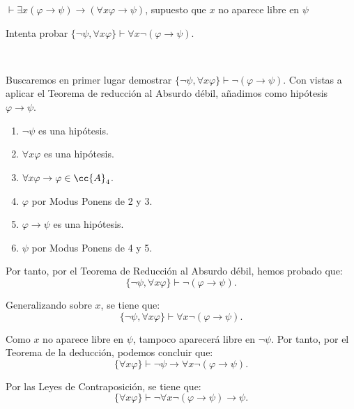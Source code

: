\begin{ejercicio}\label{ej:2.9}
    $\vdash \exists x(\varphi \rightarrow \psi) \rightarrow (\forall x \varphi \rightarrow \psi)$, supuesto que $x$ no aparece libre en $\psi$
    \begin{observacion}
        Intenta probar $\{\neg \psi, \forall x \varphi\} \vdash \forall x \neg (\varphi \rightarrow \psi)$.
    \end{observacion}~

    Buscaremos en primer lugar demostrar $\{\neg \psi, \forall x \varphi\} \vdash \neg (\varphi \rightarrow \psi)$. Con vistas a aplicar el Teorema de reducción al Absurdo débil, añadimos como hipótesis $\varphi \rightarrow \psi$.
    \begin{enumerate}
        \item $\neg \psi$ es una hipótesis.
        \item $\forall x \varphi$ es una hipótesis.
        \item $\forall x \varphi \rightarrow \varphi\in \cc{A}_4$.
        \item $\varphi$ por Modus Ponens de 2 y 3.
        \item $\varphi \rightarrow \psi$ es una hipótesis.
        \item $\psi$ por Modus Ponens de 4 y 5.
    \end{enumerate}

    Por tanto, por el Teorema de Reducción al Absurdo débil, hemos probado que:
    \begin{equation*}
        \{\neg \psi, \forall x \varphi\} \vdash \neg (\varphi \rightarrow \psi).
    \end{equation*}

    Generalizando sobre $x$, se tiene que:
    \begin{equation*}
        \{\neg \psi, \forall x \varphi\} \vdash \forall x \neg (\varphi \rightarrow \psi).
    \end{equation*}

    Como $x$ no aparece libre en $\psi$, tampoco aparecerá libre en $\neg\psi$. Por tanto, por el Teorema de la deducción, podemos concluir que:
    \begin{equation*}
        \{\forall x\varphi\} \vdash \neg\psi\rightarrow \forall x \neg (\varphi \rightarrow \psi).
    \end{equation*}

    Por las Leyes de Contraposición, se tiene que:
    \begin{equation*}
        \{\forall x\varphi\} \vdash \neg\forall x \neg (\varphi \rightarrow \psi) \rightarrow \psi.
    \end{equation*}


\end{ejercicio}

